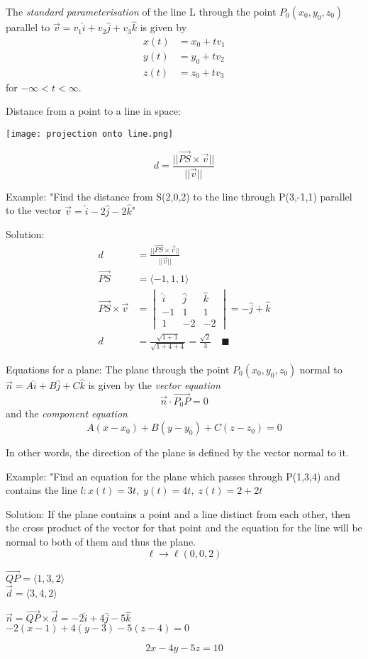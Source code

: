 \documentclass[12pt]{article}
\begin{document}
The \emph{standard parameterisation} of the line L through the point $P_0 (x_0, y_0, z_0)$ parallel to $\vec{v} = v_1 \hat{i} + v_2 \hat{j} + v_3 \hat{k}$ is given by 
\begin{align*}
    x(t) &= x_0 + tv_1\\
    y(t) &= y_0 + tv_2\\
    z(t) &= z_0 + tv_3
\end{align*}
for $-\infty < t < \infty$.

Distance from a point to a line in space:
\begin{center}
    \texttt{[image: projection onto line.png]}
\end{center}
\[d = \frac{||\vec{PS} \times \vec{v}||}{||\vec{v}||}\]

Example:
"Find the distance from S(2,0,2) to the line through P(3,-1,1) parallel to the vector $\vec{v} = \hat{i} - 2\hat{j} - 2\hat{k}$"

Solution:
\begin{align*}
    d &= \frac{||\vec{PS} \times \vec{v}||}{||\vec{v}||}\\
    \vec{PS} &= \langle -1,1,1\rangle\\
    \vec{PS} \times \vec{v} &= \begin{vmatrix}
        \hat{i} & \hat{j} & \hat{k}\\
        -1 & 1 & 1\\
        1 & -2 & -2
    \end{vmatrix} = -\hat{j} + \hat{k}\\
    d &= \frac{\sqrt{1 + 1}}{\sqrt{1 + 4 +4}} = \frac{\sqrt{2}}{3} \quad \blacksquare
\end{align*}

Equations for a plane: 
The plane through the point $P_0 (x_0, y_0, z_0)$ normal to $\vec{n} = A\hat{i} + B\hat{j} + C \hat{k}$ is given by the \emph{vector equation}
\[\vec{n} \cdot \vec{P_0 P} = 0\]
and the \emph{component equation}
\[A(x - x_0)+B(y-y_0)+C(z-z_0) = 0\]

In other words, the direction of the plane is defined by the vector normal to it. 

Example: 
"Find an equation for the plane which passes through P(1,3,4) and contains the line $l: x(t) = 3t,\; y(t) = 4t,\; z(t)=2+2t$

Solution: 
If the plane contains a point and a line distinct from each other, then the cross product of the vector for that point and the equation for the line will be normal to both of them and thus the plane. 
\[\ell \rightarrow \ell(0, 0, 2)\]
\begin{center}
    $\vec{QP} = \langle 1,3,2\rangle$\\
    $\vec{d} = \langle 3,4,2\rangle$\\
\end{center}
\begin{center}
    $\vec{n} = \vec{QP} \times \vec{d} = -2\hat{i} + 4\hat{j}-5\hat{k}$\\
    $-2(x-1)+4(y-3)-5(z-4) = 0$\\
\end{center}
\[2x -4y - 5z = 10\]
\end{document}
